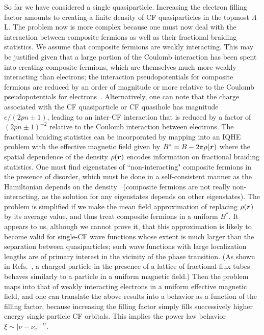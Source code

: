 \documentclass[twocolumn,floatfix,prb,aps,showpacs]{revtex4-2}
\renewcommand{\vec}[1]{\mbox{\boldmath$#1$}}
\begin{document}
So far we have considered a single quasiparticle. Increasing the electron filling factor amounts to creating a finite density of CF quasiparticles in the topmost $\Lambda$L. The problem now is more complex because one must now deal with the interaction between composite fermions as well as  their fractional braiding statistics. We assume that composite fermions are weakly interacting. This may be justified given that a large portion of the Coulomb interaction has been spent into creating composite fermions, which are themselves much more weakly interacting than electrons; the interaction pseudopotentials for composite fermions are reduced by an order of magnitude or more relative to the Coulomb pseudopotentials for electrons~\cite{Lee01,Lee02}. Alternatively, one can note that the charge associated with the CF quasiparticle or CF quasihole has magnitude $e/(2pn\pm 1)$, leading to an inter-CF interaction that is reduced by a factor of $(2pn\pm 1)^{-2}$ relative to the Coulomb interaction between electrons. The fractional braiding statistics can be incorporated by mapping into an IQHE problem with the effective magnetic field given by $B^*=B-2\pi\rho(\vec{r})$ where the spatial dependence of the density $\rho(\vec{r})$ encodes information on fractional braiding statistics. One must find eigenstates of ``non-interacting" composite fermions in the presence of disorder, which must be done in a self-consistent manner as the Hamiltonian depends on the density~\cite{Hu19} (composite fermions are not really non-interacting, as the solution for any eigenstates depends on other eigenstates). The problem is simplified if we make the mean field approximation of replacing $\rho(\vec{r})$ by its average value, and thus treat composite fermions in a uniform $B^*$. It appears to us, although we cannot prove it, that this approximation is likely to become valid for single-CF wave functions whose extent is much larger than the separation between quasiparticles; such wave functions with large localization lengths are of primary interest in the vicinity of the phase transition. (As shown in Refs.~\cite{Canright89b,Pryor91}, a charged particle in the presence of a lattice of fractional flux tubes behaves similarly to a particle in a uniform magnetic field.) Then the problem maps into that of weakly interacting electrons in a uniform effective magnetic field, and one can translate the above results into a behavior as a function of the filling factor, because increasing the filling factor simply fills successively higher energy single particle CF orbitals. This implies the power law behavior $\xi\sim |\nu-\nu_c|^{-\alpha}$. 
\end{document}
